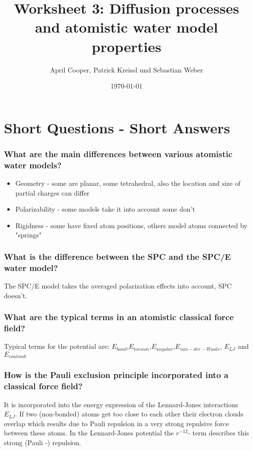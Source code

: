 \documentclass[12pt,a4paper]{scrartcl}
\author{April Cooper, Patrick Kreissl und Sebastian Weber}
\title{Worksheet 3: Diffusion processes and atomistic water model properties}
\date{\today}
\begin{document}
\maketitle
\tableofcontents
\newpage

\section{Short Questions - Short Answers}


\subsubsection*{What are the main differences between various atomistic water models?}
\begin{itemize}
\item Geometry - some are planar, some tetrahedral, also the location and size of partial charges can differ 
\item Polarizability - some models take it into account some don't
\item Rigidness - some have fixed atom positions, others model atoms connected by "springs"
\end{itemize}

\subsubsection*{What is the difference between the SPC and the SPC/E water model? }
The SPC/E model takes the averaged polarization effects  into account, SPC doesn't.

\subsubsection*{What are the typical terms in an atomistic classical force field?}
Typical terms for the potential are: $E_{bond}$,$E_{torsion}$,$E_{angular}$,$E_{van-der-Waals}$, $E_{LJ}$ and 
$E_{coulomb}$

\subsubsection*{How is the Pauli exclusion principle incorporated into a classical force field?}
It is incorporated into the energy expression of the Lennard-Jones interactions $E_{LJ}$. If two (non-bonded) atoms get too close to each other their electron clouds overlap which results due to Pauli repulsion in a very strong repulsive force between these atoms. In the Lennard-Jones  potential the $r^{-12}$- term describes this strong (Pauli -) repulsion.
\end{document}
